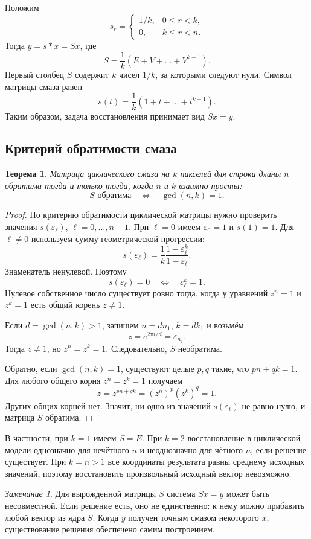 \documentclass[12pt,a4paper]{article}
\newtheorem{theorem}{Теорема}
\theoremstyle{definition}
\theoremstyle{remark}
\newtheorem*{remark}{Замечание}
\newcommand{\eps}{\varepsilon}
\begin{document}
Положим
\[
  s_r=\begin{cases}1/k,&0\leqslant r<k,\\0,&k\leqslant r<n.\end{cases}
\]
Тогда $y=s*x=Sx$, где
\[
  S=\frac1k(E+V+\dots+V^{k-1}).
\]
Первый столбец $S$ содержит $k$ чисел $1/k$, за которыми следуют нули.
Символ матрицы смаза равен
\[
  \boxed{s(t)=\frac1k(1+t+\dots+t^{k-1})}.
\]
Таким образом, задача восстановления принимает вид $Sx=y$.

\subsection{Критерий обратимости смаза}

\begin{theorem}
Матрица циклического смаза на $k$ пикселей для строки длины $n$ обратима
тогда и только тогда, когда $n$ и $k$ взаимно просты:
\[
  \boxed{S\text{ обратима}\quad\Longleftrightarrow\quad\gcd(n,k)=1}.
\]
\end{theorem}

\begin{proof}
По критерию обратимости циклической матрицы нужно проверить значения
$s(\eps_\ell)$, $\ell=0,\dots,n-1$. При $\ell=0$ имеем
$\eps_0=1$ и $s(1)=1$. Для $\ell\ne0$ используем сумму геометрической
прогрессии:
\[
  s(\eps_\ell)=\frac1k\frac{1-\eps_\ell^k}{1-\eps_\ell}.
\]
Знаменатель ненулевой. Поэтому
\[
  s(\eps_\ell)=0\quad\Longleftrightarrow\quad\eps_\ell^k=1.
\]
Нулевое собственное число существует ровно тогда, когда у уравнений
$z^n=1$ и $z^k=1$ есть общий корень $z\ne1$.

Если $d=\gcd(n,k)>1$, запишем $n=dn_1$, $k=dk_1$ и возьмём
\[
  z=e^{2\pi i/d}=\eps_{n_1}.
\]
Тогда $z\ne1$, но $z^n=z^k=1$. Следовательно, $S$ необратима.

Обратно, если $\gcd(n,k)=1$, существуют целые $p,q$ такие, что
$pn+qk=1$. Для любого общего корня $z^n=z^k=1$ получаем
\[
  z=z^{pn+qk}=(z^n)^p(z^k)^q=1.
\]
Других общих корней нет. Значит, ни одно из значений $s(\eps_\ell)$
не равно нулю, и матрица $S$ обратима.
\end{proof}

В частности, при $k=1$ имеем $S=E$. При $k=2$ восстановление в
циклической модели однозначно для нечётного $n$ и неоднозначно для
чётного $n$, если решение существует. При $k=n>1$ все координаты
результата равны среднему исходных значений, поэтому восстановить
произвольный исходный вектор невозможно.

\begin{remark}
Для вырожденной матрицы $S$ система $Sx=y$ может быть несовместной.
Если решение есть, оно не единственно: к нему можно прибавить любой
вектор из ядра $S$. Когда $y$ получен точным смазом некоторого $x$,
существование решения обеспечено самим построением.
\end{remark}
\end{document}
